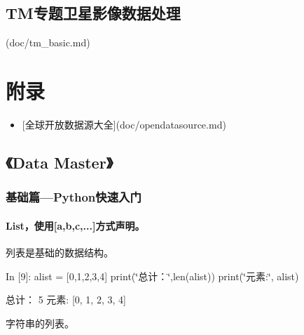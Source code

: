 \documentclass[letterpaper,10pt,english]{sphinxmanual}
\def\PYGZdq{\char`\"}
\begin{document}
\section{TM专题卫星影像数据处理}
\label{index:tm}
(doc/tm\_basic.md)


\chapter{附录}
\label{index:id4}\begin{itemize}
\item {} 
{[}全球开放数据源大全{]}(doc/opendatasource.md)

\end{itemize}


\section{《Data Master》}
\label{pystart_databasic:_u300aData-Master_u300b}\label{pystart_databasic::doc}\begin{quote}
\end{quote}


\subsection{基础篇—Python快速入门}
\label{pystart_databasic:_u57fa_u7840_u7bc7_u2014Python_u5feb_u901f_u5165_u95e8}\begin{quote}
\end{quote}


\subsubsection{List，使用{[}a,b,c,...{]}方式声明。}
\label{pystart_databasic:List_uff0c_u4f7f_u7528_a,b,c,...__u65b9_u5f0f_u58f0_u660e_u3002}
列表是基础的数据结构。

\begin{OriginalVerbatim}[commandchars=\\\{\}]
\textcolor{nbsphinxin}{In [9]: }alist = [0,1,2,3,4]
        print(\PYGZdq{}总计：\PYGZdq{},len(alist))
        print(\PYGZdq{}元素:\PYGZdq{}, alist)
\end{OriginalVerbatim}
\begin{OriginalVerbatim}[commandchars=\\\{\}]
总计： 5
元素: [0, 1, 2, 3, 4]
\end{OriginalVerbatim}
字符串的列表。
\end{document}

